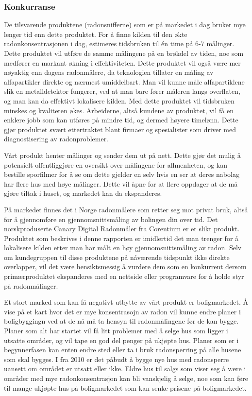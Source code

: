 \subsubsection{Konkurranse}
De tilsvarende produktene (radonsnifferne) som er på markedet i dag bruker mye lenger tid enn dette produktet. For å finne kilden til den økte radonkonsentrasjonen i dag, estimeres tidsbruken til én time på 6-7 målinger. Dette produktet vil utføre de samme målingene på en brøkdel av tiden, noe som medfører en markant økning i effektiviteten. Dette produktet vil også være mer nøyaktig enn dagens radonmålere, da teknologien tillater en måling av alfapartikler direkte og nærmest umiddelbart. Man vil kunne måle alfapartiklene slik en metalldetektor fungerer, ved at man bare fører måleren langs overflaten, og man kan da effektivt lokalisere kilden. Med dette produktet vil tidsbruken minskes og kvaliteten økes. Arbeiderne, altså kundene av produktet, vil få en enklere jobb som kan utføres på mindre tid, og dermed høyere timelønn. Dette gjør produktet svært ettertraktet blant firmaer og spesialister som driver med diagnostisering av radonproblemer.

Vårt produkt henter målinger og sender dem ut på nett. Dette gjør det mulig å potensielt offentliggjøre en oversikt over målingene for allmenheten, og kan bestille sporfilmer for å se om dette gjelder en selv hvis en ser at deres nabolag har flere hus med høye målinger. Dette vil åpne for at flere oppdager at de må gjøre tiltak i huset, og markedet kan da ekspanderes.

På markedet finnes det i Norge radonmålere som retter seg mot privat bruk, altså for å gjennomføre en gjennomsnittsmåling av bolingen din over tid. Det norskproduserte Canary Digital Radonmåler fra Corentium er et slikt produkt. Produktet som beskrives i denne rapporten er imidlertid det man trenger for å lokalisere kilden etter man har målt en høy gjennomsnittsmåling av radon. Selv om kundegruppen til disse produktene på nåværende tidspunkt ikke direkte overlapper, vil det være hensiktsmessig å vurdere dem som en konkurrent dersom primærproduktet ekspanderes med en nettside eller programvare for å holde styr på radonmålinger.

Et stort marked som kan få negativt utbytte av vårt produkt er boligmarkedet. Å vise på et kart hvor det er mye konsentrasojn av radon vil kunne endre planer i boligbyggingn ved at de nå må ta hensyn til radonmålingene før de kan bygge. Planer som alt har startet vil få litt problemer med å selge hus som ligger i utsatte områder, og vil tape en god del penger på ukjøpte hus. Planer som er i begynnerfasen kan enten endre sted eller ta i bruk radonsperring på alle husene som skal bygges. I fra 2010 er det påbudt å bygge nye hus med radonsperre uansett om området er utsatt eller ikke. Eldre hus til salgs som viser seg å være i områder med mye radonkonsentrasjon kan bli vanskjelig å selge, noe som kan føre til mange ukjøpte hus på boligmarkedet som kan senke prisene på boligmarkedet.
